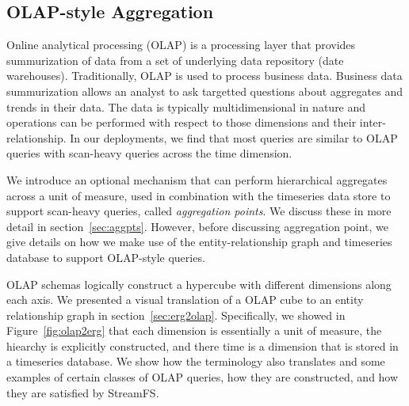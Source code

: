 
\subsection{OLAP-style Aggregation}

Online analytical processing (OLAP) is a processing layer that provides summurization of data
from a set of underlying data repository (date warehouses).  Traditionally, OLAP is used to process
business data.  Business data summurization allows an analyst to ask targetted questions about aggregates 
and trends in their data.  The data is typically multidimensional in nature and operations can be performed with
respect to those dimensions and their inter-relationship.  In our deployments, we find that most queries are 
similar to OLAP queries with scan-heavy queries across the time dimension.

We introduce an optional mechanism that can perform hierarchical aggregates across a unit of measure, used in combination
with the timeseries data store to support scan-heavy queries, called \emph{aggregation points}.  We discuss
these in more detail in section~\ref{sec:aggpts}.  However, before discussing aggregation point, we give details
on how we make use of the entity-relationship graph and timeseries database to support OLAP-style queries.

OLAP schemas logically construct a hypercube with different dimensions along each axis.  We presented a visual translation of
a OLAP cube to an entity relationship graph in section~\ref{sec:erg2olap}.  Specifically, we showed in Figure~\ref{fig:olap2erg}
that each dimension is essentially a unit of measure, the hiearchy is explicitly constructed, and there
time is a dimension that is stored in a timeseries database.  We show how the terminology also translates and some
examples of certain classes of OLAP queries, how they are constructed, and how they are satisfied by StreamFS.

